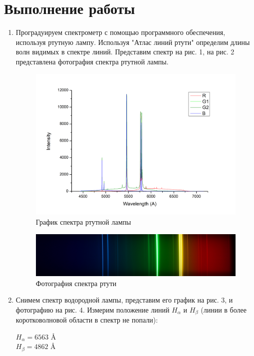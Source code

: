 \documentclass[a4paper]{article}
\begin{document}
\section{Выполнение работы}
\begin{enumerate}
    \item Проградуируем спектрометр с помощью программного обеспечения, используя ртутную лампу. Используя "Атлас линий ртути" определим длины волн видимых в спектре линий. Представим спектр на рис. 1, на рис. 2 представлена фотография спектра ртутной лампы.
    
    \begin{figure}[h]
    \centering
    \includegraphics[width=\textwidth]{Graph2.png}
    \caption{График спектра ртутной лампы}
    \label{fig:vac}
\end{figure}

\begin{figure}[h]
    \centering
    \includegraphics[width=15cm]{Hg_cut.JPG}
    \caption{Фотография спектра ртути}
    \label{fig:vac}
\end{figure}

\item Снимем спектр водородной лампы, представим его график на рис. 3, и фотографию на рис. 4. Измерим положение линий $H_{\alpha}$ и $H_{\beta}$ (линии в более коротковолновой области в спектр не попали):
\begin{center}
    $H_{\alpha} = 6563$ \AA \\
    $H_{\beta} = 4862$ \AA 
\end{center}



\end{enumerate}
\end{document}
